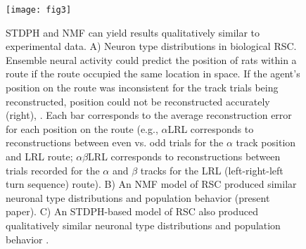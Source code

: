 \begin{figure}[t]
	\centering
	\texttt{[image: fig3]}
    \caption{STDPH and NMF can yield results qualitatively similar to experimental data. A) Neuron type distributions in biological RSC. Ensemble neural activity could predict the position of rats within a route if the route occupied the same location in space. If the agent's position on the route was inconsistent for the track trials being reconstructed, position could not be reconstructed accurately (right), \cite{AlexanderNitz2015}. Each bar corresponds to the average reconstruction error for each position on the route (e.g., $\alpha$LRL corresponds to reconstructions between even vs. odd trials for the $\alpha$ track position and LRL route; $\alpha$$\beta$LRL corresponds to reconstructions between trials recorded for the $\alpha$ and $\beta$ tracks for the LRL (left-right-left turn sequence) route). B) An NMF model of RSC produced similar neuronal type distributions and population behavior (present paper). C) An STDPH-based model of RSC also produced qualitatively similar neuronal type distributions and population behavior \cite{Rounds2016}.}
	\label{fig:NMF|RSC}
\end{figure} 





